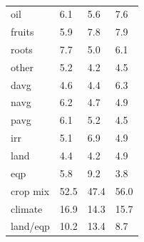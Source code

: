 \documentclass[12pt]{article}
\begin{document}
\begin{table}[h!]
{\begin{tabular}{llll}
oil & 6.1 & 5.6 & 7.6 \\
fruits & 5.9 & 7.8 & 7.9 \\
roots & 7.7 & 5.0 & 6.1 \\
other & 5.2 & 4.2 & 4.5 \\
davg & 4.6 & 4.4 & 6.3 \\
navg & 6.2 & 4.7 & 4.9 \\
pavg & 6.1 & 5.2 & 4.5 \\
irr & 5.1 & 6.9 & 4.9 \\
land & 4.4 & 4.2 & 4.9 \\
eqp & 5.8 & 9.2 & 3.8 \\
\midrule
crop mix & 52.5 & 47.4 & 56.0 \\
climate & 16.9 & 14.3 & 15.7 \\
land/eqp & 10.2 & 13.4 & 8.7 \\
\bottomrule
\end{tabular}
\caption{ }
\label{t.ny.wt_percentages}
}
\end{table}

\clearpage


\end{document}
